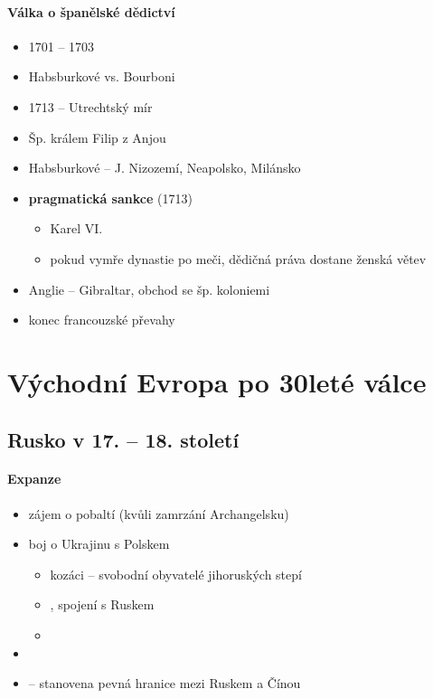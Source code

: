 \paragraph{Válka o španělské dědictví}
\begin{itemize}
\item 1701 -- 1703
\item Habsburkové vs. Bourboni
\item 1713 -- Utrechtský mír
\item Šp. králem Filip z Anjou
\item Habsburkové -- J. Nizozemí, Neapolsko, Milánsko
\item \textbf{pragmatická sankce} (1713)
	\begin{itemize}
	\item Karel VI.
	\item pokud vymře dynastie po meči, dědičná práva dostane ženská větev
	\end{itemize}
\item Anglie -- Gibraltar, obchod se šp. koloniemi
\item konec francouzské převahy
\end{itemize}



\section{Východní Evropa po 30leté válce}
\subsection{Rusko v 17. -- 18. století}
\paragraph{Expanze}
\begin{itemize}
\item zájem o pobaltí (kvůli zamrzání Archangelsku)
\item boj o Ukrajinu s Polskem 
	\begin{itemize}
	\item kozáci -- svobodní obyvatelé jihoruských stepí
	\item {}, spojení s Ruskem
	\item {}
	\end{itemize}
\item {}
\item {} -- stanovena pevná hranice mezi Ruskem a Čínou
\end{itemize}

